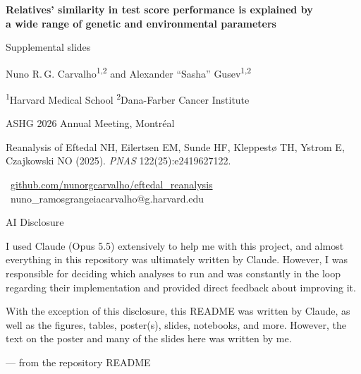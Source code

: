 \documentclass[aspectratio=169, 10pt]{beamer}
\begin{document}
\begin{frame}[plain]
  \centering\vspace{1.5em}
  {\color{navy}\Large\bfseries Relatives\textquoteright{} similarity in test score performance is explained by\\[0.15em]
   a wide range of genetic and environmental parameters\par}
  \vspace{1em}
  {\large Supplemental slides\par}
  \vspace{1.2em}
  Nuno R.\,G. Carvalho\textsuperscript{1,2} \quad and \quad Alexander ``Sasha'' Gusev\textsuperscript{1,2}\par
  \vspace{0.3em}
  {\small \textsuperscript{1}Harvard Medical School \quad \textsuperscript{2}Dana-Farber Cancer Institute\par}
  \vspace{1.2em}
  {\small ASHG 2026 Annual Meeting, Montr\'eal\par}
  \vfill
  {\footnotesize\color{gray!40!ink}
  Reanalysis of Eftedal NH, Eilertsen EM, Sunde HF, Kleppest\o{} TH, Ystrom E, Czajkowski NO (2025).
  \textit{PNAS} 122(25):e2419627122.\par\smallskip
  \faGithub\ \href{https://github.com/nunorgcarvalho/eftedal_reanalysis}{github.com/nunorgcarvalho/eftedal\_reanalysis}
  \quad \faEnvelope\ nuno\_ramosgrangeiacarvalho@g.harvard.edu\par}
  \vspace{0.5em}
\end{frame}

\begin{frame}{AI Disclosure}
  \vfill
  \begin{center}\begin{minipage}{0.78\textwidth}\large\raggedright
  I used Claude (Opus 5.5) extensively to help me with this project, and almost everything in this
  repository was ultimately written by Claude. However, I was responsible for deciding which analyses
  to run and was constantly in the loop regarding their implementation and provided direct feedback
  about improving it.\par\medskip
  With the exception of this disclosure, this README was written by Claude, as well as the figures,
  tables, poster(s), slides, notebooks, and more. However, the text on the poster and many of the slides here was written by me.\par
  \bigskip\hfill{\normalsize\color{gray!40!ink}--- from the repository README}
  \end{minipage}\end{center}
  \vfill
\end{frame}
\end{document}
